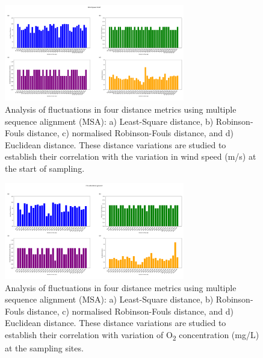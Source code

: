 \begin{figure}[]
    \centering
    \includegraphics[width=0.7\textwidth]{figure5.png}
    \caption{Analysis of fluctuations in four distance metrics using multiple sequence alignment (MSA): a) Least-Square distance, b) Robinson-Fouls distance, c) normalised Robinson-Fouls distance, and d) Euclidean distance. These distance variations are studied to establish their correlation with the variation in wind speed (m/s) at the start of sampling. \label{fig:fig6}}
\end{figure}

\begin{figure}[]
    \centering
    \includegraphics[width=0.7\textwidth]{figure6.png}
    \caption{Analysis of fluctuations in four distance metrics using multiple sequence alignment (MSA): a) Least-Square distance, b) Robinson-Fouls distance, c) normalised Robinson-Fouls distance, and d) Euclidean distance. These distance variations are studied to establish their correlation with variation of O\textsubscript{2} concentration (mg/L) at the sampling sites. \label{fig:fig7}}
\end{figure}

